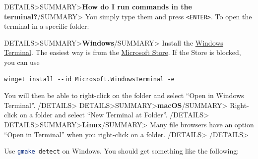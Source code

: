\documentclass[a4paper,british]{article}
\newenvironment{foldedframe}[1][]{%
    \<DETAILS>\<SUMMARY>\textbf{#1}\</SUMMARY>}%
  {\</DETAILS>}
\newenvironment{foldedframe}[1][]{\bgroup\colorlet{TFFrameColor}{SpringGreen}
  \colorlet{TFTitleColor}{black}\begin{titled-frame}{#1}}{\end{titled-frame}\egroup}
\def\cmdinline{\lstinline[language=bash,frame=none]}
\begin{document}
\begin{foldedframe}[How do I run commands in the terminal?]
  You simply type them and press \texttt{<ENTER>}. To open the terminal in a specific folder:

  \begin{foldedframe}[Windows]
    Install the \href{https://github.com/microsoft/terminal?tab=readme-ov-file#via-windows-package-manager-cli-aka-winget}{Windows Terminal}. The easiest way is from the \href{https://apps.microsoft.com/store/detail/windows-terminal/9N0DX20HK701}{Microsoft Store}. If the Store is blocked, you can use
    \begin{lstlisting}
winget install --id Microsoft.WindowsTerminal -e
    \end{lstlisting}

    You will then be able to right-click on the folder and select ``Open in Windows Terminal''.
  \end{foldedframe}
  \begin{foldedframe}[macOS]
    Right-click on a folder and select ``New Terminal at Folder''.
  \end{foldedframe}
  \begin{foldedframe}[Linux]
    Many file browsers have an option ``Open in Terminal'' when you right-click on a folder.
  \end{foldedframe}
\end{foldedframe}

Use \cmdinline|gmake detect| on Windows. You should get something like the following:
\end{document}
